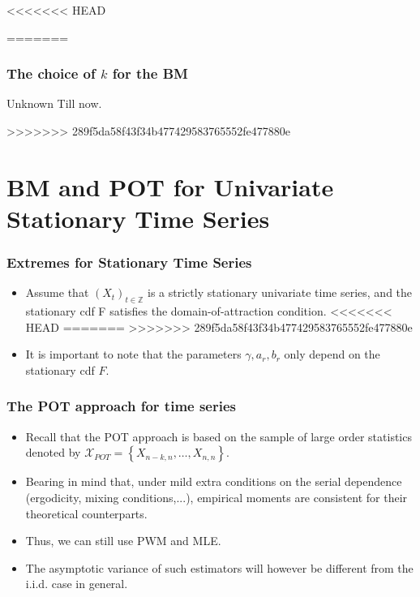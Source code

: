 \documentclass{beamer}
\newcommand{\suit}[1]{\left(#1\right)}
\newcommand{\set}[1]{\left\{#1\right\}}
\begin{document}
<<<<<<< HEAD

=======
\begin{frame}
    \frametitle{The choice of $k$ for the BM}
    \begin{center}
        Unknown Till now.
    \end{center}

    

\end{frame}
>>>>>>> 289f5da58f43f34b477429583765552fe477880e

\section{BM and POT for Univariate Stationary Time Series}
\begin{frame}
    \frametitle{Extremes for Stationary Time Series}
\begin{itemize}
    \item Assume that $\suit{X_t}_{t\in \mathbb{Z}}$ is a strictly stationary univariate time series, and the
    stationary cdf F satisfies the domain-of-attraction condition.
<<<<<<< HEAD
    \bigskip
=======
>>>>>>> 289f5da58f43f34b477429583765552fe477880e
    \item It is important to note that
    the parameters $\gamma,a_r,b_r$ only depend on the stationary cdf $F$.
\end{itemize}
    

\end{frame}


\begin{frame}
    \frametitle{The POT approach for time series}

\begin{itemize}
    \item    Recall that the POT approach is based on the sample of large order statistics denoted by $\mathcal{X}_{POT}=\set{X_{n-k,n},\dots, X_{n,n}}$.
    \item Bearing in mind that, under mild extra conditions on the serial
    dependence (ergodicity, mixing conditions,...), empirical moments are consistent for their theoretical counterparts.
    \item Thus, we can still use PWM and MLE.
    \item The asymptotic variance of such estimators will however
    be different from the i.i.d. case in general.
\end{itemize}
\end{frame}
\end{document}
